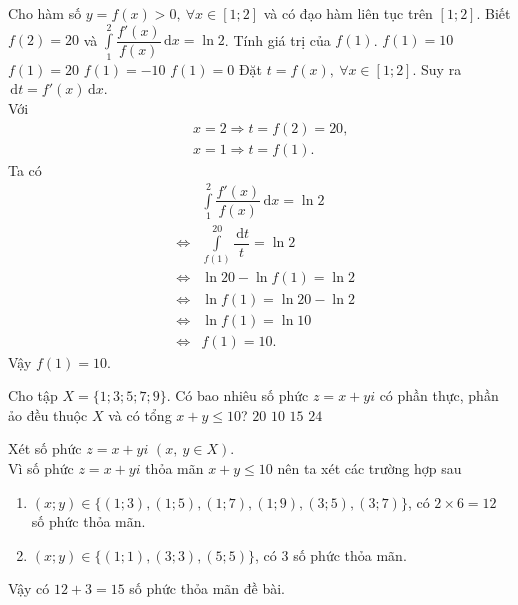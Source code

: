 \begin{ex}%
	Cho hàm số $y=f(x)>0,~\forall x \in [1;2]$ và có đạo hàm liên tục trên $[1;2]$. Biết $f(2)=20$ và $\displaystyle\int\limits_1^2 \dfrac{f'(x)}{f(x)}\mathrm{\,d}x=\ln2$. Tính giá trị của $f(1)$.
	\choice
	{\True $f(1)=10$}
	{$f(1)=20$}
	{$f(1)=-10$}
	{$f(1)=0$}
	\loigiai
	{
		Đặt $t=f(x),~\forall x \in [1;2]$. Suy ra $\mathrm{\,d}t=f'(x)\mathrm{\,d}x$.\\
		Với
		\begin{eqnarray*}
			& &x=2\Rightarrow t=f(2)=20,\\
			& &x=1\Rightarrow t=f(1).
		\end{eqnarray*} 
		Ta có 
		\begin{eqnarray*}
			& &\displaystyle\int\limits_1^2 \dfrac{f'(x)}{f(x)}\mathrm{\,d}x=\ln2 \\
			& \Leftrightarrow & \displaystyle\int\limits_{f(1)}^{20} \dfrac{\mathrm{\,d}t}{t}=\ln2\\
			& \Leftrightarrow & \ln20-\ln f(1)=\ln2\\
			& \Leftrightarrow & \ln f(1)=\ln20-\ln2\\
			& \Leftrightarrow & \ln f(1)=\ln10\\
			& \Leftrightarrow & f(1)=10.
		\end{eqnarray*}
	Vậy $f(1)=10$.
	}
\end{ex}

\begin{ex}%
	Cho tập $X=\{1;3;5;7;9\}$. Có bao nhiêu số phức $z=x+yi$ có phần thực, phần ảo đều thuộc $X$ và có tổng $x+y\le10$?
	\choice
	{$20$}
	{$10$}
	{\True $15$}
	{$24$}
	\loigiai
	{
		Xét số phức  $z=x+yi$ $(x,~y\in X)$.\\
		Vì số phức  $z=x+yi$ thỏa mãn $x+y\le10$ nên ta xét các trường hợp sau
		\begin{enumerate}
			\item $(x;y) \in \{(1;3),(1;5),(1;7),(1;9),(3;5),(3;7)\}$, có $2\times6=12$ số phức thỏa mãn.
			\item $(x;y) \in \{(1;1),(3;3),(5;5)\}$, có $3$ số phức thỏa mãn.
		\end{enumerate}
		Vậy có $12+3=15$ số phức thỏa mãn đề bài.
	}
\end{ex}

